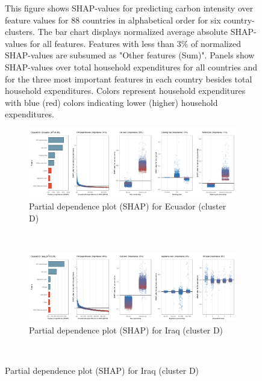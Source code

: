 \begin{figure}[ht!]
    \begin{subcaption2}
     This figure shows SHAP-values for predicting carbon intensity over feature values for 88 countries in alphabetical order for six country-clusters. The bar chart displays normalized average absolute SHAP-values for all features. Features with less than 3\% of normalized SHAP-values are subsumed as "Other features (Sum)". Panels show SHAP-values over total household expenditures for all countries and for the three most important features in each country besides total household expenditures. Colors represent household expenditures with blue (red) colors indicating lower (higher) household expenditures.
     \end{subcaption2}
\end{figure}

\begin{figure}[ht!]\ContinuedFloat
    \centering
   \begin{subfigure}[b]{\textwidth}
   \centering
         \caption{Partial dependence plot (SHAP) for Ecuador (cluster D)}
         \label{fig:5b_ECU}
         \includegraphics[width=\textwidth]{Figure 5b/Figure_5b_ECU} 
   \end{subfigure}
    \\
    \vspace{0.5cm}
    \begin{subfigure}[b]{\textwidth}
   \centering
         \caption{Partial dependence plot (SHAP) for Iraq (cluster D)}
         \label{fig:5b_IRQ}
         \includegraphics[width=\textwidth]{Figure 5b/Figure_5b_IRQ}    
   \end{subfigure}
    \\

\end{figure}
